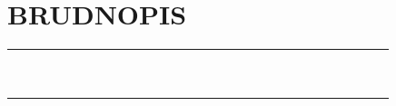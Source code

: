 \documentclass[10pt]{article}
\begin{document}
\section*{BRUDNOPIS}
\begin{center}
\begin{tabular}{|c|c|c|c|c|c|c|c|c|c|c|c|c|c|c|c|c|c|c|c|c|c|c|c|c|c|c|c|c|c|}
\hline
 &  &  &  &  &  &  &  &  &  &  &  &  &  &  &  &  &  &  &  &  &  &  &  &  &  &  &  &  &  \\
\hline
 &  &  &  &  &  &  &  &  &  &  &  &  &  &  &  &  &  &  &  &  &  &  &  &  &  &  &  &  &  \\
\hline
 &  &  &  &  &  &  &  &  &  &  &  &  &  &  &  &  &  &  &  &  &  &  &  &  &  &  &  &  &  \\
\hline
 &  &  &  &  &  &  &  &  &  &  &  &  &  &  &  &  &  &  &  &  &  &  &  &  &  &  &  &  &  \\
\hline
 &  &  &  &  &  &  &  &  &  &  &  &  &  &  &  &  &  &  &  &  &  &  &  &  &  &  &  &  &  \\
\hline
 &  &  &  &  &  &  &  &  &  &  &  &  &  &  &  &  &  &  &  &  &  &  &  &  &  &  &  &  &  \\
\hline
 &  &  &  &  &  &  &  &  &  &  &  &  &  &  &  &  &  &  &  &  &  &  &  &  &  &  &  &  &  \\
\hline
 &  &  &  &  &  &  &  &  &  &  &  &  &  &  &  &  &  &  &  &  &  &  &  &  &  &  &  &  &  \\
\hline
 &  &  &  &  &  &  &  &  &  &  &  &  &  &  &  &  &  &  &  &  &  &  &  &  &  &  &  &  &  \\
\hline
 &  &  &  &  &  &  &  &  &  &  &  &  &  &  &  &  &  &  &  &  &  &  &  &  &  &  &  &  &  \\
\hline
 &  &  &  &  &  &  &  &  &  &  &  &  &  &  &  &  &  &  &  &  &  &  &  &  &  &  &  &  &  \\
\hline
\end{tabular}
\end{center}
\end{document}
